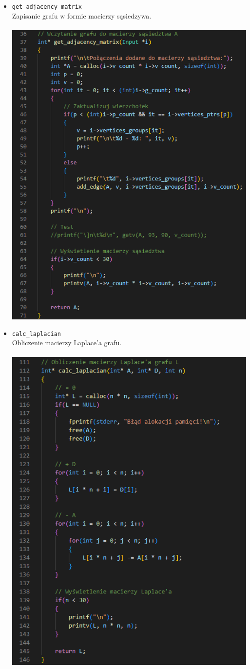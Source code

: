 \documentclass{article}
\begin{document}
\begin{itemize}
        \item \texttt{get\_adjacency\_matrix} \\
        Zapisanie grafu w formie macierzy sąsiedzywa. \\\\      \includegraphics[width=0.8\linewidth, center]{img/get_adjacency_matrix.png}
        
        \item \texttt{calc\_laplacian} \\
        Obliczenie macierzy Laplace'a grafu. \\\\
        \includegraphics[width=0.8\linewidth, center]{img/calc_laplacian.png}
        

\end{itemize}
\end{document}
